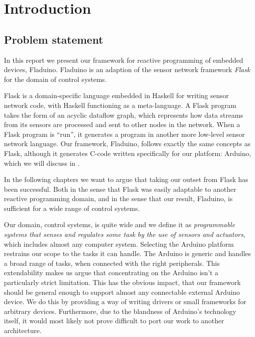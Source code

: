 \documentclass[a4paper, oneside, final]{memoir}
\let\fref\undefined
\begin{document}



\mainmatter

\chapter{Introduction}

\section{Problem statement}
In this report we present our framework for reactive programming of
embedded devices, Fladuino. Fladuino is an adaption of the
sensor network framework \textit{Flask} for the domain of control
systems.

Flask is a domain-specific language embedded in Haskell for writing
sensor network code, with Haskell functioning as a meta-language. A
Flask program takes the form of an acyclic dataflow graph, which
represents how data streams from its sensors are processed and sent to
other nodes in the network. When a Flask program is ``run'', it
generates a program in another more low-level sensor network
language. Our framework, Fladuino, follows exactly the same concepts
as Flask, although it generates C-code written specifically for our
platform: Arduino, which we will discuss in \fref{sec:hardware platform}.

In the following chapters we want to argue that taking our outset from
Flask has been successful. Both in the sense that Flask was easily
adaptable to another reactive programming domain, and in the sense that our
result, Fladuino, is sufficient for a wide range of control systems.

Our domain, control systems, is quite wide and we define it as
\textit{programmable systems that senses and regulates some task by the use of
  sensors and actuators}, which includes almost any computer system.  Selecting
the Arduino platform restrains our scope to the tasks it can handle. The Arduino
is generic and handles a broad range of tasks, when connected with the right
peripherals. This extendability makes us argue that concentrating on the Arduino
isn't a particularly strict limitation. This has the obvious impact, that our
framework should be general enough to support almost any connectable
external Arduino device. We do this by providing a way of writing drivers or small
frameworks for arbitrary devices.  Furthermore, due to the blandness of
Arduino's technology itself, it would most likely not prove difficult to port
our work to another architecture.
\end{document}

